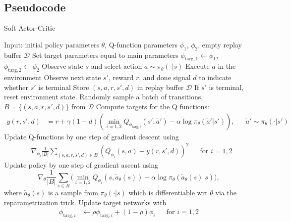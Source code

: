 \documentclass[letterpaper,10pt,english]{sphinxmanual}
\begin{document}
\subsection{Pseudocode}
\label{\detokenize{algorithms/sac:pseudocode}}\begin{algorithm}[H]
    \caption{Soft Actor-Critic}
    \label{alg1}
\begin{algorithmic}[1]
    \STATE Input: initial policy parameters $\theta$, Q-function parameters $\phi_1$, $\phi_2$, empty replay buffer $\mathcal{D}$
    \STATE Set target parameters equal to main parameters $\phi_{\text{targ},1} \leftarrow \phi_1$, $\phi_{\text{targ},2} \leftarrow \phi_2$
    \REPEAT
        \STATE Observe state $s$ and select action $a \sim \pi_{\theta}(\cdot|s)$
        \STATE Execute $a$ in the environment
        \STATE Observe next state $s'$, reward $r$, and done signal $d$ to indicate whether $s'$ is terminal
        \STATE Store $(s,a,r,s',d)$ in replay buffer $\mathcal{D}$
        \STATE If $s'$ is terminal, reset environment state.
                \STATE Randomly sample a batch of transitions, $B = \{ (s,a,r,s',d) \}$ from $\mathcal{D}$
                \STATE Compute targets for the Q functions:
                \begin{align*}
                    y (r,s',d) &= r + \gamma (1-d) \left(\min_{i=1,2} Q_{\phi_{\text{targ}, i}} (s', \tilde{a}') - \alpha \log \pi_{\theta}(\tilde{a}'|s')\right), && \tilde{a}' \sim \pi_{\theta}(\cdot|s')
                \end{align*}
                \STATE Update Q-functions by one step of gradient descent using
                \begin{align*}
                    & \nabla_{\phi_i} \frac{1}{|B|}\sum_{(s,a,r,s',d) \in B} \left( Q_{\phi_i}(s,a) - y(r,s',d) \right)^2 && \text{for } i=1,2
                \end{align*}
                \STATE Update policy by one step of gradient ascent using
                \begin{equation*}
                    \nabla_{\theta} \frac{1}{|B|}\sum_{s \in B} \Big(\min_{i=1,2} Q_{\phi_i}(s, \tilde{a}_{\theta}(s)) - \alpha \log \pi_{\theta} \left(\left. \tilde{a}_{\theta}(s) \right| s\right) \Big),
                \end{equation*}
                where $\tilde{a}_{\theta}(s)$ is a sample from $\pi_{\theta}(\cdot|s)$ which is differentiable wrt $\theta$ via the reparametrization trick.
                \STATE Update target networks with
                \begin{align*}
                    \phi_{\text{targ},i} &\leftarrow \rho \phi_{\text{targ}, i} + (1-\rho) \phi_i && \text{for } i=1,2
                \end{align*}
            \ENDFOR
        \ENDIF
\end{algorithmic}
\end{algorithm}
\end{document}
